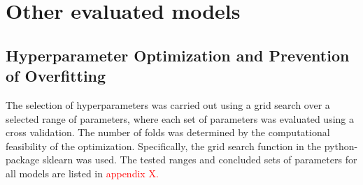 \section{Other evaluated models}
\subsection{Hyperparameter Optimization and Prevention of Overfitting}

The selection of hyperparameters was carried out using a grid search over a selected range of parameters, where each set of parameters was evaluated using a cross validation. The number of folds was determined by the computational feasibility of the optimization. Specifically, the grid search function in the python-package sklearn was used. The tested ranges and concluded sets of parameters for all models are listed in \textcolor{red}{appendix X.}